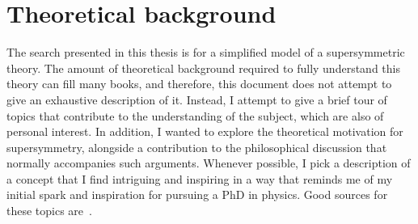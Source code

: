 \chapter{Theoretical background}

The search presented in this thesis is for a simplified model of a supersymmetric theory. The amount of theoretical background required to fully understand this theory can fill many books, and therefore, this document does not attempt to give an exhaustive description of it. Instead, I attempt to give a brief tour of topics that contribute to the understanding of the subject, which are also of personal interest. In addition, I wanted to explore the theoretical motivation for supersymmetry, alongside a contribution to the philosophical discussion that normally accompanies such arguments. Whenever possible, I pick a description of a concept that I find intriguing and inspiring in a way that reminds me of my initial spark and inspiration for pursuing a PhD in physics. Good sources for these topics are~\cite{Peskin2019-bt,Srednicki2007-mn}.

